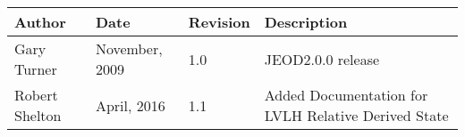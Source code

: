 %
%
% 
%



\begin{tabular}{||l|l|l|l|} \hline
 {\bf Author} & {\bf Date} &  {\bf Revision} & {\bf Description} \\ \hline \hline
 Gary Turner & November, 2009 & 1.0  & JEOD2.0.0 release \\ \hline
 Robert Shelton & April, 2016 & 1.1  & Added Documentation for LVLH Relative Derived State \\ \hline
\end{tabular}
